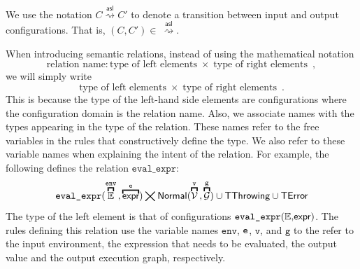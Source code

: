 \documentclass{book}
\newcommand\overname[2]{\overbracket{#1}^{#2}}
\newcommand\XGraphs[0]{\mathcal{G}}
\newcommand\vals[0]{\mathcal{V}}
\newcommand\evalarrow[0]{\stackrel{\mathsf{asl}}{\rightsquigarrow}}
\newcommand\aslrel[0]{\bigtimes}
\newcommand\aslsep[0]{\mathbf{,}}
\newcommand\TError[0]{\textsf{TError}}
\newcommand\TThrowing[0]{\textsf{TThrowing}}
\newcommand\TContinuing[0]{\textsf{TContinuing}}
\newcommand\TReturning[0]{\textsf{TReturning}}
\newcommand\TOutConfig[0]{\textsf{TOutConfig}}
\newcommand\evalexpr[1]{\texttt{eval\_expr}(#1)}
\newcommand\evalcatchers[1]{\texttt{eval\_catchers}(#1)}
\newcommand\evalcall[1]{\texttt{eval\_call}(#1)}
\newcommand\evalspec[1]{\texttt{eval\_spec}(#1)}
\newcommand\Normal[0]{\textsf{Normal}}
\newcommand\env[0]{\texttt{env}}
\newcommand\vg[0]{\texttt{g}}
\newcommand\vv[0]{\texttt{v}}
\begin{document}

  We use the notation $C \evalarrow C'$ to denote a transition between input and output configurations.
  That is, $(C, C') \in\ \evalarrow$.

  When introducing semantic relations, instead of using the mathematical notation
  \[
    \text{relation name} : \text{type of left elements} \;\times\; \text{type of right elements} \enspace,
  \]
  we will simply write
  \[
    \text{type of left elements} \;\times\; \text{type of right elements} \enspace.
  \]
  This is because the type of the left-hand side elements are configurations where the
  configuration domain is the relation name.
  Also, we associate names with the types appearing in the type of the relation.
  These names refer to the free variables in the rules that constructively define the type.
  We also refer to these variable names when explaining the intent of the relation.
  For example, the following defines the relation $\texttt{eval\_expr}$:
  \[
    \evalexpr{\overname{\envs}{\env} \aslsep \overname{\expr}{\ve}} \aslrel \Normal(\overname{\vals}{\vv} \aslsep \overname{\XGraphs}{\vg}) \cup \TThrowing \cup \TError
  \]
  The type of the left element is that of configurations $\evalexpr{\envs \aslsep \expr}$.
  The rules defining this relation use the variable names
  $\env$, $\texttt{e}$, $\vv$, and $\vg$ to the refer to the input environment, the expression that needs to be evaluated,
  the output value and the output execution graph, respectively.
\end{document}
